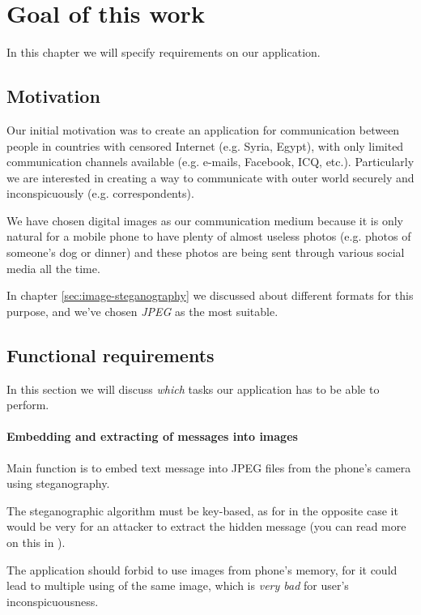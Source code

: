 \chapter{Goal of this work}
\label{ch:goal}

In this chapter we will specify requirements on our application.

\section{Motivation}

Our initial motivation was to create an application for communication between
people in countries with censored Internet (e.g. Syria, Egypt), with only limited communication channels
available (e.g. e-mails, Facebook, ICQ, etc.). Particularly we are interested in
creating a way to communicate with outer world securely and inconspicuously 
(e.g. correspondents).

We have chosen digital images as our communication medium because it is only natural for
a mobile phone to have plenty of almost useless photos (e.g. photos of someone's dog or dinner)
and these photos are being sent through various social media all the time.

In chapter \ref{sec:image-steganography} we discussed about different formats for
this purpose, and we've chosen \emph{JPEG} as the most suitable.

\section{Functional requirements}
In this section we will discuss \emph{which} tasks our application has to be able to perform.

\subsubsection{Embedding and extracting of messages into images}
Main function is to embed text message into JPEG files from the phone's camera using steganography.

The steganographic algorithm must be key-based, as for in the opposite case it would be very for an attacker
to extract the hidden message (you can read more on this in \cite{Ostertag1996}).

The application should forbid to use images from phone's memory, for it could lead to multiple 
using of the same image, which is \emph{very bad} for user's inconspicuousness.

